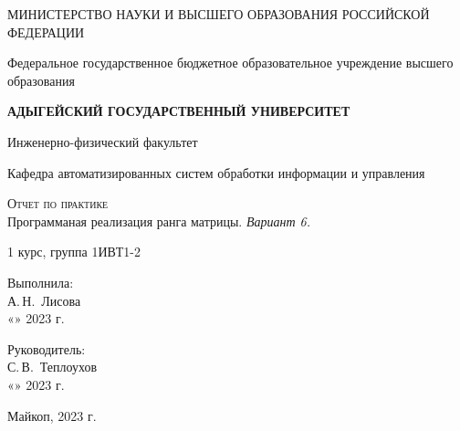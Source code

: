 \documentclass[12pt,a4paper]{scrartcl}
\begin{document}
	\begin{titlepage}
		\begin{center}
			\large
			МИНИСТЕРСТВО НАУКИ И ВЫСШЕГО ОБРАЗОВАНИЯ РОССИЙСКОЙ ФЕДЕРАЦИИ
			
			Федеральное государственное бюджетное образовательное учреждение высшего образования
			
			\textbf{АДЫГЕЙСКИЙ ГОСУДАРСТВЕННЫЙ УНИВЕРСИТЕТ}
			\vspace{0.25cm}
			
			Инженерно-физический факультет
			
			Кафедра автоматизированных систем обработки информации и управления
			\vfill

			\vfill
			
			\textsc{Отчет по практике}\\[5mm]
			
			{\LARGE Программаная реализация ранга матрицы. \textit{Вариант 6.}}
			\bigskip
			
			1 курс, группа 1ИВТ1-2
		\end{center}
		\vfill
		
		\newlength{\ML}
		\hfill\begin{minipage}{0.5\textwidth}
			Выполнила:\\
			\underline{\hspace{\ML}} А.\,Н.~Лисова\\
			«\underline{\hspace{0.7cm}}» \underline{\hspace{2cm}} 2023 г.
		\end{minipage}%
		\bigskip
		
		\hfill\begin{minipage}{0.5\textwidth}
			Руководитель:\\
			\underline{\hspace{\ML}} С.\,В.~Теплоухов\\
			«\underline{\hspace{0.7cm}}» \underline{\hspace{2cm}} 2023 г.
		\end{minipage}%
		\vfill
		
		\begin{center}
			Майкоп, 2023 г.
		\end{center}
	\end{titlepage}
	
\end{document}
